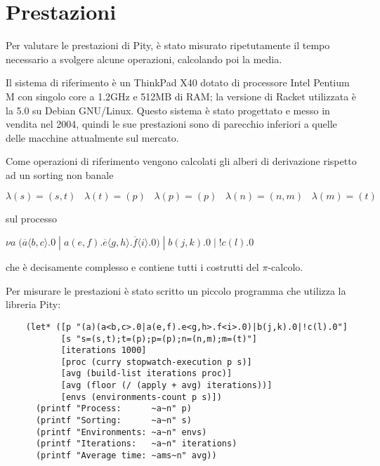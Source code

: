 \chapter{Prestazioni}

Per valutare le prestazioni di Pity, \`e stato misurato ripetutamente il
tempo necessario a svolgere alcune operazioni, calcolando poi la media.

Il sistema di riferimento \`e un ThinkPad X40 dotato di processore Intel
Pentium M con singolo core a 1.2GHz e 512MB di RAM; la versione di Racket
utilizzata \`e la 5.0 su Debian GNU/Linux. Questo sistema \`e stato
progettato e messo in vendita nel 2004, quindi le sue prestazioni sono
di parecchio inferiori a quelle delle macchine attualmente sul mercato.

Come operazioni di riferimento vengono calcolati gli alberi di
derivazione rispetto ad un sorting non banale

\begin{pilisting}
$
    \lambda(s) = (s,t) \;\;\;
    \lambda(t) = (p)   \;\;\;
    \lambda(p) = (p)   \;\;\;
    \lambda(n) = (n,m) \;\;\;
    \lambda(m) = (t)
$
\end{pilisting}

sul processo

\begin{pilisting}
$
   \nu a \; (\overline{a}\langle b,c\rangle.0 \; | \;
             a(e,f).\overline{e}\langle g,h\rangle.
             \overline{f}\langle i\rangle.0) \; | \;
   b(j,k).0 \; | \;
   !c(l).0
$
\end{pilisting}

che \`e decisamente complesso e contiene tutti i costrutti del
$\pi$-calcolo.

Per misurare le prestazioni \`e stato scritto un piccolo programma
che utilizza la libreria Pity:

\begin{lstlisting}
    (let* ([p "(a)(a<b,c>.0|a(e,f).e<g,h>.f<i>.0)|b(j,k).0|!c(l).0"]
           [s "s=(s,t);t=(p);p=(p);n=(n,m);m=(t)"]
           [iterations 1000]
           [proc (curry stopwatch-execution p s)]
           [avg (build-list iterations proc)]
           [avg (floor (/ (apply + avg) iterations))]
           [envs (environments-count p s)])
      (printf "Process:      ~a~n" p)
      (printf "Sorting:      ~a~n" s)
      (printf "Environments: ~a~n" envs)
      (printf "Iterations:   ~a~n" iterations)
      (printf "Average time: ~ams~n" avg))
\end{lstlisting}


